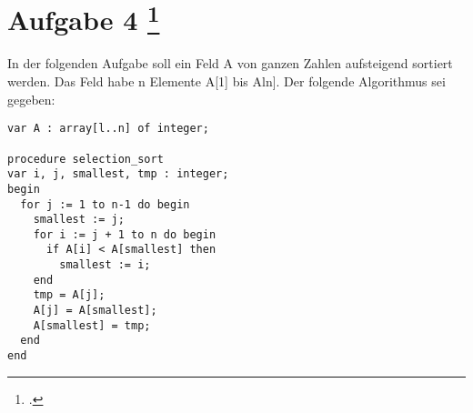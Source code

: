 \documentclass{lehramt-informatik-aufgabe}
\begin{document}
\section{Aufgabe 4
\footcite{46115:2019:09}}

In der folgenden Aufgabe soll ein Feld A von ganzen Zahlen aufsteigend
sortiert werden. Das Feld habe n Elemente A[1] bis Aln]. Der folgende
Algorithmus sei gegeben:

\begin{verbatim}
var A : array[l..n] of integer;

procedure selection_sort
var i, j, smallest, tmp : integer;
begin
  for j := 1 to n-1 do begin
    smallest := j;
    for i := j + 1 to n do begin
      if A[i] < A[smallest] then
        smallest := i;
    end
    tmp = A[j];
    A[j] = A[smallest];
    A[smallest] = tmp;
  end
end

\end{verbatim}
\end{document}
